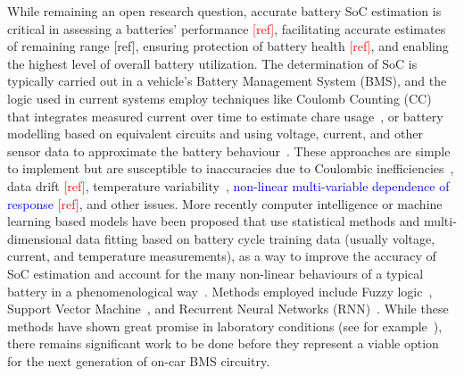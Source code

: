 %
%
While remaining an open research question, accurate battery SoC estimation is critical in assessing a batteries' performance \textcolor{red}{[ref]}, facilitating accurate estimates of remaining range [ref], ensuring protection of battery health \textcolor{red}{[ref]}, and enabling the highest level of overall battery utilization.
The determination of SoC is typically carried out in a vehicle's Battery Management System (BMS), and the logic used in current systems employ techniques like Coulomb Counting (CC) that integrates measured current over time to estimate chare usage~\cite{ng_enhanced_2009,robust_SoC}, or battery modelling based on equivalent circuits and using voltage, current, and other sensor data to approximate the battery behaviour~\cite{6953745}.
These approaches are simple to implement but are susceptible to inaccuracies due to Coulombic inefficiencies~\cite{Smith_2010}, data drift \textcolor{red}{[ref]}, temperature variability~\cite{xing_state_2014}, \textcolor{blue}{non-linear multi-variable dependence of response \textcolor{red}{[ref]}}, and other issues.
More recently computer intelligence or machine learning based models have been proposed that use statistical methods and multi-dimensional data fitting based on battery cycle training data (usually voltage, current, and temperature measurements), as a way to improve the accuracy of SoC estimation and account for the many non-linear behaviours of a typical battery in a phenomenological way~\cite{hansen_support_2005,anton_battery_2013,he_state_2014}.
Methods employed include Fuzzy logic~\cite{malkhandi_fuzzy_2006}, Support Vector Machine~\cite{hansen_support_2005, anton_battery_2013}, and Recurrent Neural Networks (RNN)~\cite{song_lithium-ion_2018,Chemali2017,mamo_long_2020,jiao_gru-rnn_2020,xiao_accurate_2019,javid_adaptive_2020,zhang_deep_2020}.
While these methods have shown great promise in laboratory conditions (see for example~\cite{jiao_gru-rnn_2020}), there remains significant work to be done before they represent a viable option for the next generation of on-car BMS circuitry.

